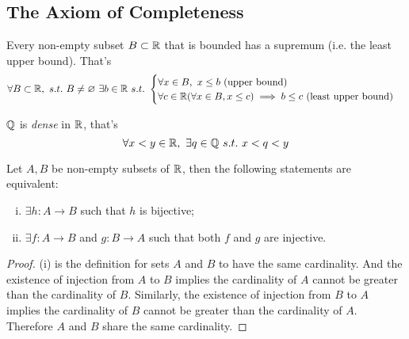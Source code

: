 \documentclass[11pt]{article}
\begin{document}
        \subsection{The Axiom of Completeness}
            \begin{axiom}
                Every non-empty subset $B \subset \mathbb{R}$ that is bounded has a supremum (i.e. the least upper bound). That's
                \begin{equation}
                    \forall B \subset \R,\ s.t.\ B \neq \varnothing\ \exists b \in \R\ s.t.\ 
                    \begin{cases}
                        \forall x \in B,\ x \leq b \tx{ (upper bound)} \\
                        \forall c \in \R (\forall x \in B, x \leq c) \implies b \leq c \tx{ (least upper bound)}
                    \end{cases}
                \end{equation}
            \end{axiom}
            
            \begin{theorem}
                $\mathbb{Q}$ is \emph{dense} in $\mathbb{R}$, that's
                \begin{equation}
                    \forall x < y \in \R,\ \exists q \in \Q\ s.t.\ x < q < y
                \end{equation}
            \end{theorem}
            
            \begin{theorem}[Cardinality]
                Let $A, B$ be non-empty subsets of $\mathbb{R}$, then the following statements are equivalent:
                \begin{enumerate}[(i)]
                    \item $\exists h: A \to B$ such that $h$ is bijective;
                    \item $\exists f: A \to B$ and $g: B \to A$ such that both $f$ and $g$ are injective.
                \end{enumerate}
            \end{theorem}
            
            \begin{proof}
                (i) is the definition for sets $A$ and $B$ to have the same cardinality. And the existence of injection from $A$ to $B$ implies the cardinality of $A$ cannot be greater than the cardinality of $B$. Similarly, the existence of injection from $B$ to $A$ implies the cardinality of $B$ cannot be greater than the cardinality of $A$. Therefore $A$ and $B$ share the same cardinality.
            \end{proof}
            
\end{document}
